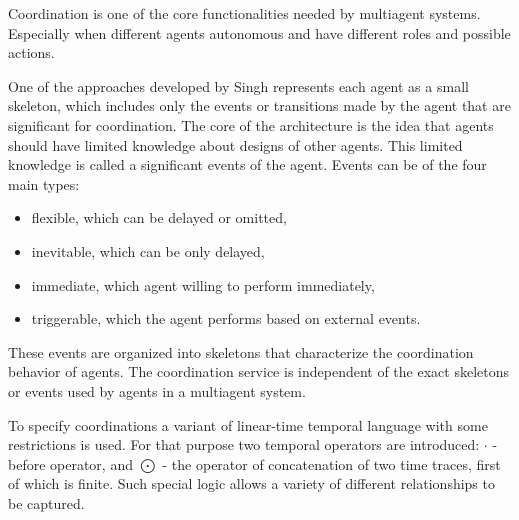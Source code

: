 Coordination is one of the core functionalities needed by multiagent systems. Especially when different agents autonomous and have different roles and possible actions. 

One of the approaches developed by Singh \cite{Singh_97} represents each agent as a small skeleton, which includes only the events or
transitions made by the agent that are significant for coordination. The core of the architecture is the idea that agents should have limited knowledge about designs of other agents. This limited knowledge is called a significant events of the agent. Events can be of the four main types:
\begin{itemize}
  \item flexible, which can be delayed or omitted,
  \item inevitable, which can be only delayed,
  \item immediate, which agent willing to perform immediately,
  \item triggerable, which the agent performs based on external events.
\end{itemize}
These events are organized into skeletons that characterize the coordination behavior of agents. The coordination service is independent of the exact skeletons or events used by agents in a multiagent system.

To specify coordinations a variant of linear-time temporal language with some restrictions is used. For that purpose two temporal operators are introduced: $\cdot$ - before operator, and $\bigodot$ - the operator of concatenation of two time traces, first of which is finite. Such special logic allows a variety of different relationships to be captured. 